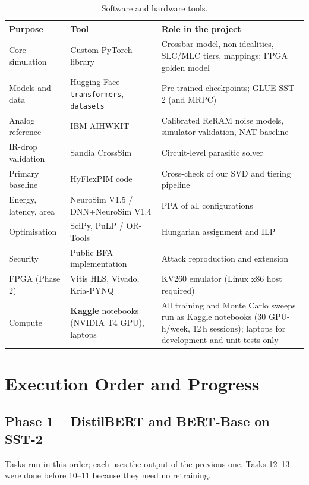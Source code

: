 \documentclass[10pt,a4paper]{article}
\begin{document}
\begin{table}[h]
\centering\small
\caption{Software and hardware tools.}
\begin{tabularx}{\linewidth}{@{}l l X@{}}
\toprule
Purpose & Tool & Role in the project \\
\midrule
Core simulation & Custom PyTorch library & Crossbar model, non-idealities, SLC/MLC tiers, mappings; FPGA golden model \\
Models and data & Hugging Face \texttt{transformers}, \texttt{datasets} & Pre-trained checkpoints; GLUE SST-2 (and MRPC) \\
Analog reference & IBM AIHWKIT & Calibrated ReRAM noise models, simulator validation, NAT baseline \\
IR-drop validation & Sandia CrossSim & Circuit-level parasitic solver \\
Primary baseline & HyFlexPIM code & Cross-check of our SVD and tiering pipeline \\
Energy, latency, area & NeuroSim V1.5 / DNN+NeuroSim V1.4 & PPA of all configurations \\
Optimisation & SciPy, PuLP / OR-Tools & Hungarian assignment and ILP \\
Security & Public BFA implementation & Attack reproduction and extension \\
FPGA (Phase 2) & Vitis HLS, Vivado, Kria-PYNQ & KV260 emulator (Linux x86 host required) \\
Compute & \textbf{Kaggle} notebooks (NVIDIA T4 GPU), laptops & All training and Monte Carlo sweeps run as Kaggle notebooks (30 GPU-h/week, 12\,h sessions); laptops for development and unit tests only \\
\bottomrule
\end{tabularx}
\end{table}

\section{Execution Order and Progress}

\subsection{Phase 1 -- DistilBERT and BERT-Base on SST-2}
Tasks run in this order; each uses the output of the previous one. Tasks 12--13 were done before 10--11
because they need no retraining.
\end{document}
